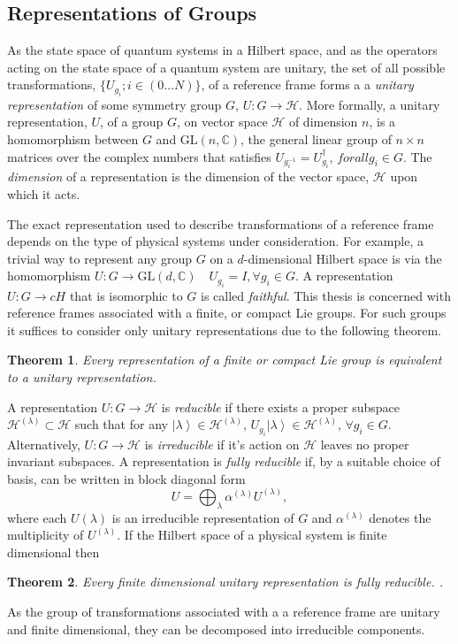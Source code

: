 \documentclass{article}
\newcommand{\ket}[1]{\left|#1\right\rangle}
\newcommand\defn[1]{\textsl{#1}}
\newcommand\cH{{\mathscr{H}}}
\newtheorem{theorem}{Theorem}
\begin{document}
 
\subsection{Representations of Groups}
 
As the state space of quantum systems in a Hilbert space, and as the operators acting on the state space of a quantum system are unitary, the set of all possible transformations, $\{U_{g_i}; i\in (0\ldots N)\}$, of a reference frame forms a a \defn{unitary representation} of some symmetry group $G$, $U:G\rightarrow\cH$.  More formally, a unitary representation, $U$, of a group $G$, on vector space $\cH$ of dimension $n$, is a homomorphism between $G$ and $\mathrm{GL}(n, \mathbb{C})$, the general linear group of $n\times n$ matrices over the complex numbers that satisfies $U_{g_i^{-1}}=U_{g_i}^\dagger, \, forall g_i\in G$.  The \defn{dimension} of a representation is the dimension of the vector space, $\cH$ upon which it acts.  

The exact representation used to describe transformations of a reference frame depends on the type of physical systems  under consideration. For example, a trivial way to represent any group $G$ on a $d$-dimensional Hilbert space is via the homomorphism $U:G\rightarrow\mathrm{GL}(d,\mathbb{C})\quad U_{g_i}=I, \forall g_i\in G$. A representation $U:G\rightarrow
cH$ that is isomorphic to $G$ is called \defn{faithful}.  This thesis is concerned with reference frames associated with a finite, or compact Lie groups.  For such groups it suffices to consider only unitary representations due to the following theorem.
\begin{theorem}
Every representation of a finite or compact Lie group is equivalent to a unitary representation.
\label{thm:1}
\end{theorem}

A representation $U:G\rightarrow\cH$ is \defn{reducible} if there exists a proper subspace $\cH^{(\lambda)}\subset\cH$ such that for any
$\ket{\lambda}\in\cH^{(\lambda)}$, $U_{g_i}\ket{\lambda}\in\cH^{(\lambda)},\,\forall g_i\in G$.  Alternatively, $U:G\rightarrow\cH$ is \defn{irreducible} if  it's action on $\cH$ leaves no proper invariant subspaces. A representation is \defn{fully reducible} if, by a suitable choice of basis, can be written in block diagonal form
\begin{equation}
 U=\bigoplus_\lambda \alpha^{(\lambda)} U^{(\lambda)},
\label{28}
\end{equation}
where each $U{(\lambda)}$ is an irreducible representation of $G$ and $\alpha^{(\lambda)}$ denotes the multiplicity of $U^{(\lambda)}$.  If the Hilbert space of a physical system is finite dimensional then
\begin{theorem}
Every finite dimensional unitary representation is fully reducible.
\label{thm:2}.
\end{theorem}
As the group of transformations associated with a a reference frame are unitary and finite dimensional, they can be decomposed into irreducible components.
\end{document}
